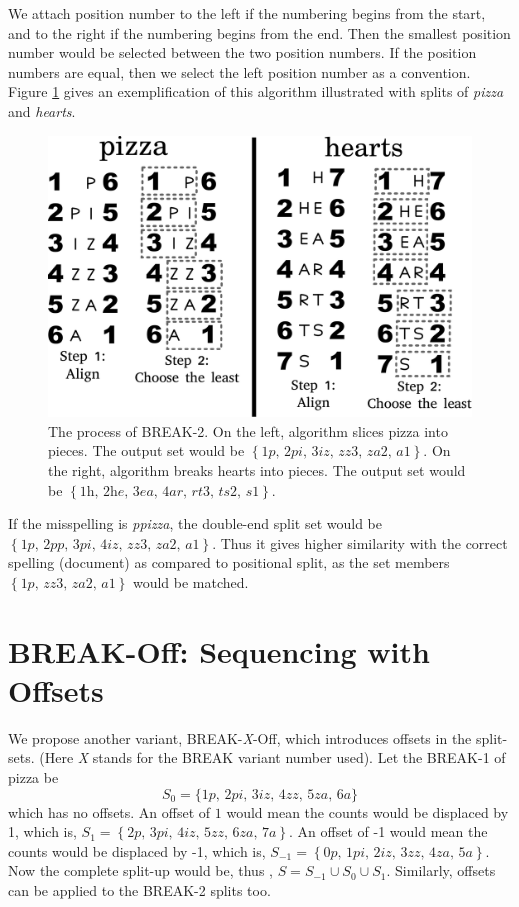 We attach position number to the left if the numbering begins from the start, and to the right if the numbering begins from the end.
Then the smallest position number would be selected between the two position numbers.
If the position numbers are equal, then we select the left position number as a convention.
Figure \ref{algo} gives an exemplification of this algorithm illustrated with splits of \textit{pizza} and \textit{hearts}.

\begin{figure}[h]
	\centering
	\includegraphics[width=\textwidth]{gfx/alg.pdf}
	\caption{The process of BREAK-2. On the left, algorithm slices pizza into pieces. The output set would be $\left\lbrace \textit{1p, 2pi, 3iz, zz3, za2, a1} \right\rbrace$. On the right, algorithm breaks hearts into pieces. The output set would be $\left\lbrace \textit{1h, 2he, 3ea, 4ar, rt3, ts2, s1} \right\rbrace$. }
	\label{algo}
\end{figure}
If the misspelling is \textit{ppizza}, the double-end split set would be $\left\lbrace \textit{1p, 2pp, 3pi, 4iz, zz3, za2, a1} \right\rbrace$. 
Thus it gives higher similarity with the correct spelling (document) as compared to positional split, as the set members $\left\lbrace \textit{1p, zz3, za2, a1} \right\rbrace$ would be matched.

\section{BREAK-Off: Sequencing with Offsets} 
We propose another variant, BREAK-\textit{X}-Off, which introduces offsets in the split-sets. 
(Here \textit{X} stands for the BREAK variant number used).
Let the BREAK-1 of pizza be $$S_0 = \lbrace \textit{1p, 2pi, 3iz, 4zz, 5za, 6a} \rbrace$$ which has no offsets.
An offset of $1$ would mean the counts would be displaced by 1, which is, $S_1 = \left\lbrace \textit{2p, 3pi, 4iz, 5zz, 6za, 7a} \right\rbrace$.
An offset of -1 would mean the counts would be displaced by -1, which is, $S_{-1} = \left\lbrace \textit{0p, 1pi, 2iz, 3zz, 4za, 5a} \right\rbrace$.
Now the complete split-up would be, thus , $S = S_{-1} \cup S_0 \cup S_1$. 
Similarly, offsets can be applied to the BREAK-2 splits too.

